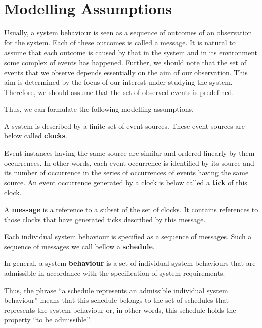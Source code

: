 \section{Modelling Assumptions}
Usually, a system behaviour is seen as a sequence of outcomes of an observation for the system.
Each of these outcomes is called a message.
It is natural to assume that each outcome is caused by that in the system and in its environment some complex of events has happened.
Further, we should note that the set of events that we observe depends essentially on the aim of our observation.
This aim is determined by the focus of our interest under studying the system.
Therefore, we should assume that the set of observed events is predefined.

Thus, we can formulate the following modelling assumptions.
\begin{assumption}\label{ma:1}
A system is described by a finite set of event sources.
These event sources are below called {\bfseries clocks}.
\end{assumption}
\begin{assumption}\label{ma:2}
Event instances having the same source are similar and ordered linearly by them occurrences.
In other words, each event occurrence is identified by its source and its number of occurrence in the series of occurrences of events having the same source.
An event occurrence generated by a clock is below called a {\bfseries tick} of this clock.
\end{assumption}
\begin{assumption}\label{ma:3}
A {\bfseries message} is a reference to a subset of the set of clocks.
It contains references to those clocks that have generated ticks described by this message.
\end{assumption}
\begin{assumption}\label{ma:4}
Each individual system behaviour is specified as a sequence of messages.
Such a sequence of messages we call bellow a {\bfseries schedule}.
\end{assumption}
\begin{assumption}
In general, a system {\bfseries behaviour} is a set of individual system behaviours that are admissible in accordance with the specification of system requirements.
\end{assumption}
Thus, the phrase ``a schedule represents an admissible individual system behaviour'' means that this schedule belongs to the set of schedules that represents the system behaviour or, in other words, this schedule holds the property ``to be admissible''.
